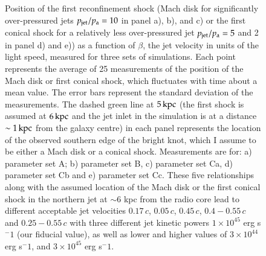 \begin{figure}
\caption{Position of the first  reconfinement shock (Mach disk for significantly over-pressured jets $p_{\rm{jet}}/p_{\rm{a}}=10$ in panel a), b), and c) or the first conical shock for a relatively less over-pressured jet $p_{\rm{jet}}/p_{\rm{a}} = 5$ and 2 in panel d) and e)) as a function of $\beta$, the jet velocity in units of the light speed, measured for three sets of simulations. Each point represents the average of 25 measurements of the position of the Mach disk or first conical shock, which fluctuates with time about a mean value. The error bars represent the standard deviation of the measurements. The dashed green line at $5 \, \rm kpc$ (the first shock is assumed at $6 \, \rm kpc$ and the jet inlet in the simulation is at a distance $\sim 1 \, \rm kpc$ from the galaxy centre) in each panel represents the location of the observed southern edge of the bright knot, which I assume to be either a Mach disk or a conical shock. Measurements are for: a) parameter set A; b) parameter set B, c) parameter set Ca, d) parameter set Cb and e) parameter set Cc. These five relationships along with the assumed location of the Mach disk or the first conical shock in the northern jet at $\sim6$ kpc from the radio core lead to different acceptable jet velocities $0.17\,c$, $0.05\,c$, $0.45\,c$, $0.4-0.55\,c$ and $0.25 - 0.55\,c$ with three different jet kinetic powers $1\times10^{45}$ erg s$^-1$ (our fiducial value), as well as lower and higher values of $3\times10^{44}$ erg s$^-1$, and $3\times10^{45}$ erg s$^-1$.}
\label{mach_position}
\end{figure}



